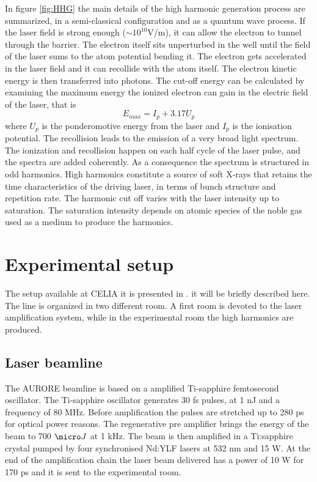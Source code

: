 In figure \ref{fig:HHG} the main details of the high harmonic generation process are summarized, in a semi-classical configuration and as a quantum wave process.
If the laser field is strong enough ($\sim 10^{10}$V/m), it can allow the electron to tunnel through the barrier. The electron itself sits unperturbed in the well until the field of the laser sums to the atom potential bending it.
The electron gets accelerated in the laser field and it can recollide with the atom itself. The electron kinetic energy is then transferred into photons.
The cut-off energy can be calculated by examining the maximum energy the ionized electron can gain in the electric field of the laser, that is
\begin{equation}
E_{max} = I_{p}+3.17U_{p}
\end{equation}
where $U_{p}$ is the ponderomotive energy from the laser and $I_{p}$ is the ionisation potential. The recollision leads to the emission of a very broad light spectrum.
The ionization and recollision happen on each half cycle of the laser pulse, and the spectra are added coherently. As a consequence the spectrum is structured in odd harmonics.
High harmonics constitute a source of soft X-rays that retains the time characteristics of the driving laser, in terms of bunch structure and repetition rate. 
The harmonic cut off varies with the laser intensity up to saturation. The saturation intensity depends on atomic species of the noble gas used as a medium to produce the harmonics.

\section{Experimental setup}
The setup available at CELIA it is presented in \cite{Martin2001}. it will be briefly described here. The line is organized in two different room. A first room is devoted to the laser amplification system, while in the experimental room the high harmonics are produced.
\subsection{Laser beamline}
The AURORE beamline is based on a amplified Ti-sapphire femtosecond oscillator. 
The Ti-sapphire oscillator generates 30 fs pulses, at 1 nJ and a frequency of 80 MHz. Before amplification the pulses are stretched up to 280 ps for optical power reasons.
The regenerative pre amplifier brings the energy of the beam to 700 $\micro J$ at 1 kHz.
The beam is then amplified in a Ti:sapphire crystal pumped by four synchronised Nd:YLF lasers at 532 nm and 15 W.
At the end of the amplification chain the laser beam delivered has a power of 10 W for 170 ps and it is sent to the experimental room.
